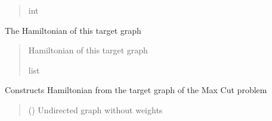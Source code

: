 \documentclass[letterpaper,10pt,english]{sphinxmanual}
\begin{document}
\begin{fulllineitems}
\begin{fulllineitems}
\begin{quote}
\begin{description}
\sphinxAtStartPar
int

\end{description}\end{quote}

\end{fulllineitems}


\begin{fulllineitems}
\label{\detokenize{qcompute_qapp.application.optimization:qcompute_qapp.application.optimization.MaxCut.hamiltonian}}
\pysigstartsignatures
{}
\pysigstopsignatures
\sphinxAtStartPar
The Hamiltonian of this target graph
\begin{quote}\begin{description}
\sphinxAtStartPar
Hamiltonian of this target graph

\sphinxAtStartPar
list

\end{description}\end{quote}

\end{fulllineitems}


\begin{fulllineitems}
\label{\detokenize{qcompute_qapp.application.optimization:qcompute_qapp.application.optimization.MaxCut.graph_to_hamiltonian}}
\pysigstartsignatures
{}
\pysigstopsignatures
\sphinxAtStartPar
Constructs Hamiltonian from the target graph of the Max Cut problem
\begin{quote}\begin{description}
\sphinxAtStartPar
{} () \textendash{} Undirected graph without weights


\end{description}
\end{quote}
\end{fulllineitems}
\end{fulllineitems}
\end{document}
